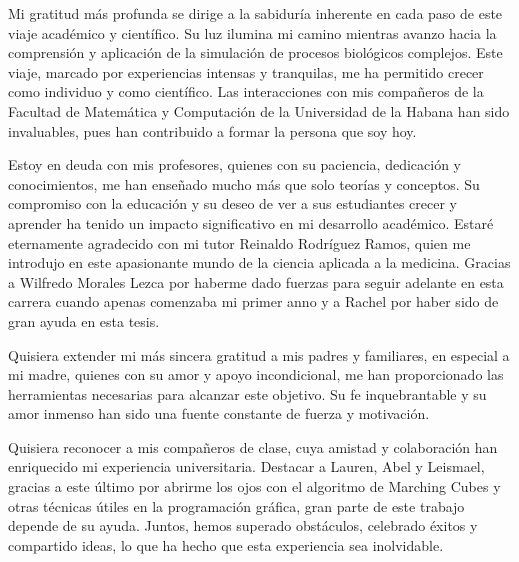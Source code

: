 \begin{acknowledgements}
Mi gratitud más profunda se dirige a la sabiduría inherente en cada paso de este viaje académico y científico. Su luz ilumina mi camino mientras avanzo hacia la comprensión y aplicación de la simulación de procesos biológicos complejos. Este viaje, marcado por experiencias intensas y tranquilas, me ha permitido crecer como individuo y como científico. Las interacciones con mis compañeros de la Facultad de Matemática y Computación de la Universidad de la Habana han sido invaluables, pues han contribuido a formar la persona que soy hoy.



Estoy en deuda con mis profesores, quienes con su paciencia, dedicación y conocimientos, me han enseñado mucho más que solo teorías y conceptos. Su compromiso con la educación y su deseo de ver a sus estudiantes crecer y aprender ha tenido un impacto significativo en mi desarrollo académico. Estar\'e eternamente agradecido con mi tutor Reinaldo Rodríguez Ramos, quien me introdujo en este apasionante mundo de la ciencia aplicada a la medicina. Gracias a Wilfredo Morales Lezca por haberme dado fuerzas para seguir adelante en esta carrera cuando apenas comenzaba mi primer anno y a Rachel por haber sido de gran ayuda en esta tesis.

Quisiera extender mi más sincera gratitud a mis padres y familiares, en especial a mi madre, quienes con su amor y apoyo incondicional, me han proporcionado las herramientas necesarias para alcanzar este objetivo. Su fe inquebrantable y su amor inmenso han sido una fuente constante de fuerza y motivación.

Quisiera reconocer a mis compañeros de clase, cuya amistad y colaboración han enriquecido mi experiencia universitaria. Destacar a Lauren, Abel y Leismael, gracias a este \'ultimo por abrirme los ojos con el algoritmo de Marching Cubes y otras t\'ecnicas \'utiles en la programación gr\'afica, gran parte de este trabajo depende de su ayuda. Juntos, hemos superado obstáculos, celebrado éxitos y compartido ideas, lo que ha hecho que esta experiencia sea inolvidable.

\end{acknowledgements}